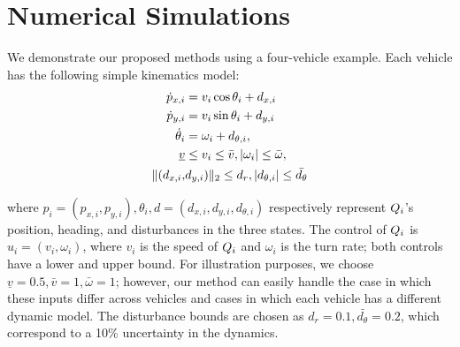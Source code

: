 \section{Numerical Simulations \label{sec:sim}}
We demonstrate our proposed methods using a four-vehicle example. Each vehicle has the following simple kinematics model:
\vspace{-0.2em}
\begin{equation}
\label{eq:dyn_i}
\begin{aligned}
\dot{p}_{x,i} &= v_i \cos \theta_i + d_{x,i} \\
\dot{p}_{y,i} &= v_i \sin \theta_i + d_{y,i}\\
\dot{\theta}_i &= \omega_i + d_{\theta,i}, \\
\underline{v} & \le v_i \le \bar{v}, |\omega_i| \le \bar{\omega},\\
\|(d_{x,i}, & d_{y,i}) \|_2 \le d_{r}, |d_{\theta,i}| \le \bar{d_{\theta}}
\end{aligned}
\end{equation}

\noindent where $p_i = (p_{x,i}, p_{y,i}), \theta_i, d = (d_{x,i}, d_{y,i}, d_{\theta,i})$ respectively represent $Q_i$'s position, heading, and disturbances in the three states. The control of $Q_i$ is $u_i = (v_i, \omega_i)$, where $v_i$ is the speed of $Q_i$ and $\omega_i$ is the turn rate; both controls have a lower and upper bound. For illustration purposes, we choose $\underline{v} = 0.5, \bar{v} = 1, \bar\omega = 1$; however, our method can easily handle the case in which these inputs differ across vehicles and cases in which each vehicle has a different dynamic model. The disturbance bounds are chosen as $d_{r} = 0.1, \bar{d_{\theta}} = 0.2$, which correspond to a 10\% uncertainty in the dynamics. %

%

